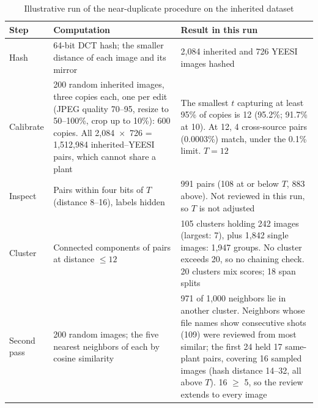 \documentclass{icsthesis}
\begin{document}
\begin{mainmatter}
				\begin{table}[htbp]
				\vspace{4ex}
				\centering
					\caption{Illustrative run of the near-duplicate procedure on the inherited dataset}
					\label{tab:calibdemo}
					\singlespacing\footnotesize
					\begin{tabular}{p{1.8cm}p{5.6cm}p{6.5cm}}
					\hline\hline
					Step & Computation & Result in this run \\ \hline
					Hash & 64-bit DCT hash; the smaller distance of each image and its mirror &
					2,084 inherited and 726 YEESI images hashed \\[3pt]
					Calibrate & 200 random inherited images, three copies each, one per edit (JPEG
					quality 70--95, resize to 50--100\%, crop up to 10\%): 600 copies.
					All 2,084~$\times$~726 = 1,512,984 inherited--YEESI pairs, which cannot share a
					plant & The smallest $t$ capturing at least 95\% of copies is 12 (95.2\%; 91.7\%
					at 10). At 12, 4 cross-source pairs (0.0003\%) match, under the 0.1\% limit.
					$T = 12$ \\[3pt]
					Inspect & Pairs within four bits of $T$ (distance 8--16), labels hidden & 991
					pairs (108 at or below $T$, 883 above). Not reviewed in this run, so $T$ is not
					adjusted \\[3pt]
					Cluster & Connected components of pairs at distance $\le 12$ & 105 clusters
					holding 242 images (largest: 7), plus 1,842 single images: 1,947 groups. No
					cluster exceeds 20, so no chaining check. 20 clusters mix scores; 18 span
					splits \\[3pt]
					Second pass & 200 random images; the five nearest neighbors of each by cosine
					similarity & 971 of 1,000 neighbors lie in another cluster. Neighbors whose
					file names show consecutive shots (109) were reviewed from most similar; the
					first 24 held 17 same-plant pairs, covering 16 sampled images (hash distance
					14--32, all above $T$). 16 $\ge$ 5, so the review extends to every image \\
					\hline\hline
					\end{tabular}
				\vspace{4ex}
				\end{table}


\end{mainmatter}
\end{document}
